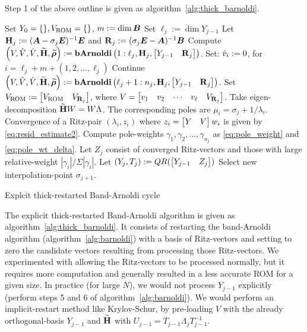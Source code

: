 Step 1 of the above outline is given as algorithm~\ref{alg:thick_barnoldi}. 

\begin{algorithm}[htb]%
\DontPrintSemicolon
{}

\BlankLine

Set $Y_0 =\{\}, V_\text{ROM}=\{\}$, $m := \dim \bm{B}$\;
 {
	Set $\ell_j := \dim Y_{j-1}$ \;
	Let $\textbf{\textup{H}}_j := (\bm{A}-\sigma_j \bm{E})^{-1}\bm{E}$ and $\textbf{\textup{R}}_j := (\sigma_j \bm{E} -\bm{A})^{-1}\bm{B}$ \; 
      Compute $\left( V ,  \hat{V}, \dot{V}, \widetilde{\textbf{\textup{H}}}, \widetilde{\boldsymbol{\rho}} \right) := \operatorname*{\textbf{bArnoldi}}\left(1:\ell_j,\textbf{\textup{H}}_j,\begin{bmatrix} Y_{j-1} &\textbf{\textup{R}}_j\end{bmatrix}\right)$.\;
Set: $\hat{v}_i := 0$, for $i = \ell_j + m + (1,2,...,\ell_j)$ 
\BlankLine	
      Continue $\left( V ,  \hat{V}, \dot{V}, \widetilde{\textbf{\textup{H}}}, \widetilde{\boldsymbol{\rho}} \right) := \operatorname*{\textbf{bArnoldi}}\left(\ell_j + 1:n_j ,\textbf{\textup{H}}_j,\begin{bmatrix} Y_{j-1} &\textbf{\textup{R}}_j\end{bmatrix}\right)$.\;
	Set $V_\text{ROM}:= \begin{bmatrix} V_\text{ROM} & V_{\textbf{\textup{R}}_j}\end{bmatrix}$, where $V = \begin{bmatrix} v_1&v_2& \cdots& v_\ell & V_{\textbf{\textup{R}}_j}\end{bmatrix}$. 
      \BlankLine
      \BlankLine	
Take eigen-decomposition $\widetilde{\textbf{\textup{H}}} W = W \Lambda$. The corresponding poles are $\mu_i = \sigma_j+1/\lambda_i$. Convergence of a Ritz-pair $(\lambda_i,z_i)$ where $z_i = \begin{bmatrix} Y &V\end{bmatrix} w_i$ is given by \eqref{eq:resid_estimate2}. \; 
\BlankLine
       Compute pole-weights $\gamma_1,\gamma_2,\ldots,\gamma_{n_j}$ as \eqref{eq:pole_weight} and \eqref{eq:pole_wt_delta}.\;
\BlankLine
	Let $Z_j$ consist of converged Ritz-vectors and those with large relative-weight $|\gamma_i|/\Sigma |\gamma_i|$.\; 
      Let $(Y_j ,T_j) := QR(\begin{bmatrix} Y_{j-1} & Z_j\end{bmatrix})$\; 
\BlankLine
	 Select new interpolation-point $\sigma_{j+1}$.  \label{line:select_point}\;
}
\BlankLine

\BlankLine
{} 
\caption{{\sc Explcit thick-restarted Band-Arnoldi cycle}}
\label{alg:thick_barnoldi}
\end{algorithm}
The explicit thick-restarted Band-Arnoldi algorithm is given as algorithm~\ref{alg:thick_barnoldi}. It consists of restarting the band-Arnoldi algorithm  (algorithm~\ref{alg:barnoldi}) with a basis of Ritz-vectors and setting to zero the candidate vectors resulting from processing those Ritz-vectors.   We experimented with allowing the Ritz-vectors to be processed normally, but it requires more computation and generally resulted in a less accurate ROM for a given size.  In practice (for large $N$), we would not process $Y_{j-1}$ explicitly (perform  steps 5 and 6 of algorithm~\ref{alg:barnoldi}).  We would perform an implicit-restart method like Krylov-Schur\cite{stewart2002krylov}, by pre-loading $V$ with the already orthogonal-basis $Y_{j-1}$ and    $\widetilde{\textbf{\textup{H}}}$ with $U_{j-1} = T_{j-1} \Lambda_j  T_{j-1}^{-1}$.

